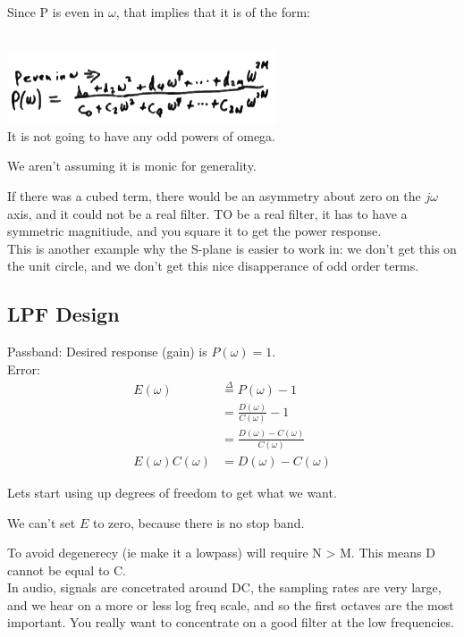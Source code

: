 Since P is even in $\omega$, that implies that it is of the form:

\\
\includegraphics[scale=0.5]{frames/14d}\\

It is not going to have any odd powers of omega. 

We aren't assuming it is monic for generality. 

If there was a cubed term, there would be an asymmetry about zero on the
$j\omega$ axis, and it could not be a real filter. TO be a real filter,
it has to have a symmetric magnitiude, and you square it to get the power
response. \\

This is another example why the S-plane is easier to work in: we don't
get this on the unit circle, and we don't get this nice disapperance of
odd order terms. 

\subsection*{LPF Design}

Passband: Desired response (gain) is $P(\omega) = 1$. \\

Error: 
\begin{align*}
    E(\omega) &\stackrel{\Delta}{=} P(\omega) - 1\\
    &= \frac{D(\omega)}{C(\omega)} - 1 \\
    &= \frac{D(\omega) - C(\omega)}{C(\omega)} \\
    E(\omega)C(\omega) &= D(\omega) - C(\omega)
\end{align*}

Lets start using up degrees of freedom to get what we want. 

We can't set $E$ to zero, because there is no stop band. 

To avoid degenerecy (ie make it a lowpass) will require N > M. This means
D cannot be equal to C. \\

In audio, signals are concetrated around DC, the sampling rates are very large,
and we hear on a more or less log freq scale, and so the first octaves are
the most important. You really want to concentrate on a good filter at the low
frequencies. \\


